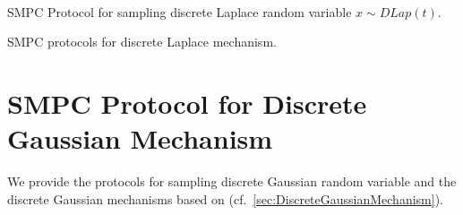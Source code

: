 \begin{protocol}[tbh!]
{{                        \\
                  }}
            \caption{SMPC Protocol for sampling discrete Laplace random variable $x \sim DLap\left(t\right) $.}
            \label{prot:DiscreteLap}
      \end{protocol}
      \FloatBarrier

      \begin{protocol}[tbh!]
            \centering
            \caption{SMPC protocols for discrete Laplace mechanism.}
            \label{prot:DLapMechanism}
      \end{protocol}
      \FloatBarrier



      \section{SMPC Protocol for Discrete Gaussian Mechanism}
      \label{MPCProtocolforDiscreteGaussianMechanism}

      We provide the \smpc protocols for sampling discrete Gaussian random variable and the discrete Gaussian mechanisms based on (cf.~\autoref{sec:DiscreteGaussianMechanism}).





